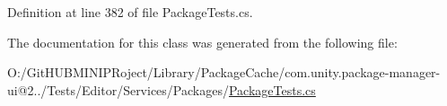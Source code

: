Definition at line 382 of file Package\+Tests.\+cs.



The documentation for this class was generated from the following file\+:\begin{DoxyCompactItemize}
\item 
O\+:/\+Git\+H\+U\+B\+M\+I\+N\+I\+P\+Roject/\+Library/\+Package\+Cache/com.\+unity.\+package-\/manager-\/ui@2../\+Tests/\+Editor/\+Services/\+Packages/\mbox{\hyperlink{_package_tests_8cs}{Package\+Tests.\+cs}}\end{DoxyCompactItemize}
